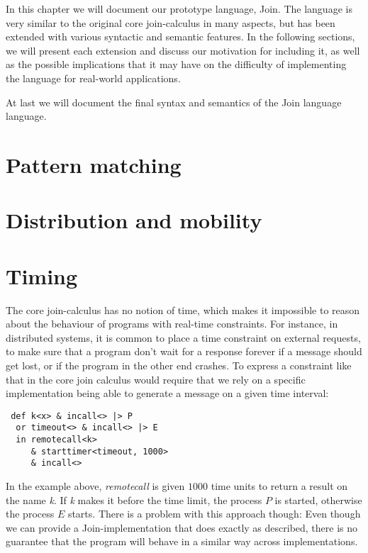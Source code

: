 In this chapter we will document our prototype language, Join.  The language is
very similar to the original core join-calculus in many aspects, but has been
extended with various syntactic and semantic features. In the following
sections, we will present each extension and discuss our motivation for
including it, as well as the possible implications that it may have on the
difficulty of implementing the language for real-world applications.

At last we will document the final syntax and semantics of the Join language
language.


\section{Pattern matching}

\section{Distribution and mobility}

\section{Timing}

The core join-calculus has no notion of time, which makes it impossible to
reason about the behaviour of programs with real-time constraints.
For instance, in distributed systems, it is common to place a time constraint
on external requests, to make sure that a program don't wait for a response
forever if a message should get lost, or if the program in the other end
crashes. To express a constraint like that in the core join calculus would
require that we rely on a specific implementation being able to generate a
message on a given time interval:
\begin{lstlisting}
 def k<x> & incall<> |> P
  or timeout<> & incall<> |> E
  in remotecall<k>
     & starttimer<timeout, 1000>
     & incall<>
\end{lstlisting}

In the example above, \emph{remotecall} is given $1000$ time units to return a
result on the name \emph{k}. If \emph{k} makes it before the time limit, the
process $P$ is started, otherwise the process $E$ starts.
There is a problem with this approach though: Even though we can provide a
Join-implementation that does exactly as described, there is no guarantee that
the program will behave in a similar way across implementations.

